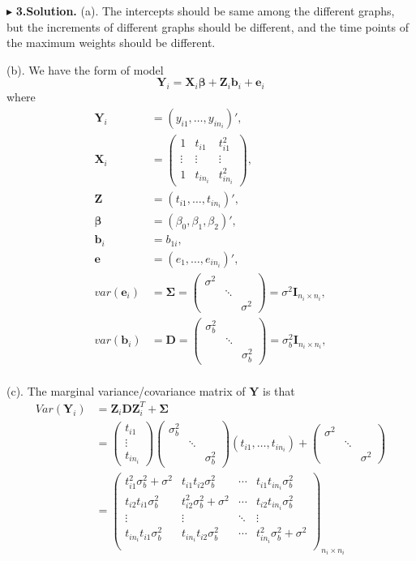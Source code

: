 \documentclass[letterpaper, 12pt]{article}
\newcommand{\ba}{$$\begin{aligned}}
\newcommand{\ea}{\end{aligned}$$}
\begin{document}
$\blacktriangleright$ \textbf{3.\quad Solution.} 
(a). The intercepts should be same among the different graphs, but the increments of different graphs should be different, and the time points of the maximum weights should be different.


(b). We have the form of model 
$$
\bm{Y}_i=\bm{X}_i\bm{\beta}+\bm{Z}_i\bm{b}_i+\bm{e}_i
$$
where 
\ba
\bm{Y}_i&=(y_{i1},\dots,y_{in_i})',\\
\bm{X}_i&=\left(\begin{matrix}
1&t_{i1}&t_{i1}^2\\
\vdots&\vdots&\vdots\\
1&t_{in_i}&t_{in_i}^2\end{matrix}\right),\\
\bm{Z}&=(t_{i1},\dots,t_{in_i})',\\
\bm{\beta}&=(\beta_0,\beta_1,\beta_2)',\\
\bm{b}_i&=b_{1i},\\
\bm{e}&=(e_1,\dots,e_{in_i})',\\
var(\bm{e}_i)&=\bm{\Sigma}=\left(\begin{matrix}
\sigma^2\\
&\ddots\\
&&\sigma^2\end{matrix}\right)=\sigma^2\bm{I}_{n_i\times n_i},\\
var(\bm{b}_i)&=\bm{D}=\left(\begin{matrix}
\sigma_b^2\\
&\ddots\\
&&\sigma_b^2\end{matrix}\right)=\sigma_b^2\bm{I}_{n_i\times n_i},\\
\ea


(c). The marginal variance/covariance matrix of $\bm{Y}$ is that
\ba
Var(\bm{Y}_i)&=\bm{Z}_i\bm{DZ}_i^T+\bm{\Sigma}\\
&=\left(\begin{matrix}
t_{i1}\\
\vdots\\
t_{in_i}\end{matrix}\right)
\left(\begin{matrix}
\sigma_b^2\\
&\ddots\\
&&\sigma_b^2\end{matrix}\right)
(t_{i1},\dots,t_{in_i})+\left(\begin{matrix}
\sigma^2\\
&\ddots\\
&&\sigma^2\end{matrix}\right)\\
&=\left(\begin{matrix}
t_{i1}^2\sigma_b^2+\sigma^2&t_{i1}t_{i2}\sigma_b^2&\cdots&t_{i1}t_{in_i}\sigma_b^2\\
t_{i2}t_{i1}\sigma_b^2&t_{i2}^2\sigma_b^2+\sigma^2&\cdots&t_{i2}t_{in_i}\sigma_b^2\\
\vdots&\vdots&\ddots&\vdots\\
t_{in_i}t_{i1}\sigma_b^2&t_{in_i}t_{i2}\sigma_b^2&\cdots&t_{in_i}^2\sigma_b^2+\sigma^2\\
\end{matrix}\right)_{n_i\times n_i}
\ea
\end{document}
